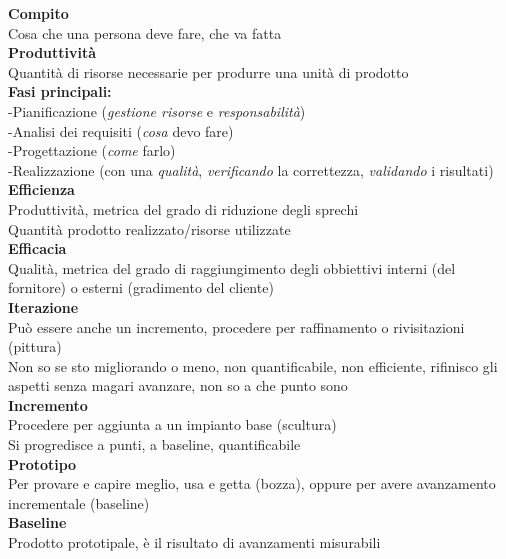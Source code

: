 \documentclass{article}
\begin{document}
		\textbf{Compito}\\
		Cosa che una persona deve fare, che va fatta\\

		\textbf{Produttività}\\
		Quantità di risorse necessarie per produrre una unità di prodotto\\

		\textbf{Fasi principali:}\\
		-Pianificazione (\textit{gestione risorse} e \textit{responsabilità})\\
		-Analisi dei requisiti (\textsl{cosa} devo fare)\\
		-Progettazione (\textit{come} farlo)\\
		-Realizzazione (con una \textit{qualità}, \textit{verificando} la correttezza, \textit{validando} i risultati)\\
		
		\textbf{Efficienza}\\
		Produttività, metrica del grado di riduzione degli sprechi\\
		Quantità prodotto realizzato/risorse utilizzate\\
		
		\textbf{Efficacia}\\
		Qualità, metrica del grado di raggiungimento degli obbiettivi interni (del fornitore) o esterni (gradimento del cliente)\\
		
		\textbf{Iterazione}\\
		Può essere anche un incremento, procedere per raffinamento o rivisitazioni (pittura)\\
		Non so se sto migliorando o meno, non quantificabile, non efficiente, rifinisco gli aspetti senza magari avanzare, non so a che punto sono\\
		
		\textbf{Incremento}\\
		Procedere per aggiunta a un impianto base (scultura)\\
		Si progredisce a punti, a baseline, quantificabile\\
		
		\textbf{Prototipo}\\
		Per provare e capire meglio, usa e getta (bozza), oppure per avere avanzamento incrementale (baseline)\\
					
		\textbf{Baseline}\\
		Prodotto prototipale, è il risultato di avanzamenti misurabili\\
		
\end{document}
